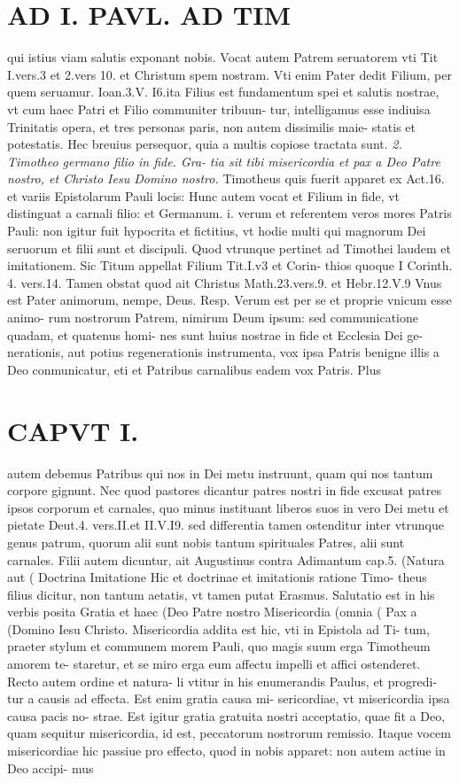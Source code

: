 \documentclass{article}
\begin{document}
\begin{pages}
\section*{AD I. PAVL. AD TIM }qui istius viam salutis exponant nobis. Vocat autem Patrem seruatorem vti Tit I.vers.3 et 2.vers 10. et Christum spem nostram. Vti enim Pater dedit Filium, per quem seruamur. Ioan.3.V. I6.ita Filius est fundamentum spei et salutis nostrae, vt cum haec Patri et Filio communiter tribuun- tur, intelligamus esse indiuisa Trinitatis opera, et tres personas paris, non autem dissimilis maie- statis et potestatis. Hec breuius persequor, quia a multis copiose tractata sunt. \textit{2. Timotheo germano filio in fide. Gra-} \textit{tia sit tibi misericordia et pax a Deo Patre} \textit{nostro, et Christo Iesu Domino nostro.} Timotheus quis fuerit apparet ex Act.16. et variis Epistolarum Pauli locis: Hunc autem vocat et Filium in fide, vt distinguat a carnali filio: et Germanum. i. verum et referentem veros mores Patris Pauli: non igitur fuit hypocrita et fictitius, vt hodie multi qui magnorum Dei seruorum et filii sunt et discipuli. Quod vtrunque pertinet ad Timothei laudem et imitationem. Sic Titum appellat Filium Tit.I.v3 et Corin- thios quoque I Corinth. 4. vers.14. Tamen obstat quod ait Christus Math.23.vers.9. et Hebr.12.V.9 Vnus est Pater animorum, nempe, Deus. Resp. Verum est per se et proprie vnicum esse animo- rum nostrorum Patrem, nimirum Deum ipsum: sed communicatione quadam, et quatenus homi- nes sunt huius nostrae in fide et Ecclesia Dei ge- nerationis, aut potius regenerationis instrumenta, vox ipsa Patris benigne illis a Deo conmunicatur, eti et Patribus carnalibus eadem vox Patris. Plus 
\section*{CAPVT I. }
\marginpar{[ p.5 ]}autem debemus Patribus qui nos in Dei metu instruunt, quam qui nos tantum corpore gignunt. Nec quod pastores dicantur patres nostri in fide excusat patres ipsos corporum et carnales, quo minus instituant liberos suos in vero Dei metu et pietate Deut.4. vers.II.et II.V.I9. sed differentia tamen ostenditur inter vtrunque genus patrum, quorum alii sunt nobis tantum spirituales Patres, alii sunt carnales. Filii autem dicuntur, ait Augustinus contra Adimantum cap.5. (Natura aut ( Doctrina Imitatione Hic et doctrinae et imitationis ratione Timo- theus filius dicitur, non tantum aetatis, vt tamen putat Erasmus. Salutatio est in his verbis posita Gratia et haec (Deo Patre nostro Misericordia (omnia ( Pax a (Domino Iesu Christo. Misericordia addita est hic, vti in Epistola ad Ti- tum, praeter stylum et communem morem Pauli, quo magis suum erga Timotheum amorem te- staretur, et se miro erga eum affectu impelli et affici ostenderet. Recto autem ordine et natura- li vtitur in his enumerandis Paulus, et progredi- tur a causis ad effecta. Est enim gratia causa mi- sericordiae, vt misericordia ipsa causa pacis no- strae. Est igitur gratia gratuita nostri acceptatio, quae fit a Deo, quam sequitur misericordia, id est, peccatorum nostrorum remissio. Itaque vocem misericordiae hic passiue pro effecto, quod in nobis apparet: non autem actiue in Deo accipi- mus 
\marginpar{[ p.6 ]}

\end{pages}
\end{document}
